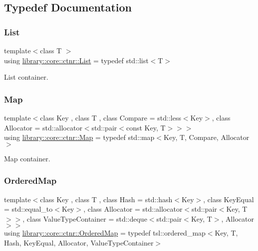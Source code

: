 \subsection{Typedef Documentation}
\mbox{\label{namespacelibrary_1_1core_1_1ctnr_a87ccf40619002299b341a5e76e989912}} 
\subsubsection{\texorpdfstring{List}{List}}
{\footnotesize\ttfamily template$<$class T $>$ \\
using \mbox{\hyperlink{namespacelibrary_1_1core_1_1ctnr_a87ccf40619002299b341a5e76e989912}{library\+::core\+::ctnr\+::\+List}} = typedef std\+::list$<$T$>$}



List container. 

\mbox{\label{namespacelibrary_1_1core_1_1ctnr_a248e088a0b4ec44aff451a5c3663dcee}} 
\subsubsection{\texorpdfstring{Map}{Map}}
{\footnotesize\ttfamily template$<$class Key , class T , class Compare  = std\+::less$<$\+Key$>$, class Allocator  = std\+::allocator$<$std\+::pair$<$const Key, T$>$$>$$>$ \\
using \mbox{\hyperlink{namespacelibrary_1_1core_1_1ctnr_a248e088a0b4ec44aff451a5c3663dcee}{library\+::core\+::ctnr\+::\+Map}} = typedef std\+::map$<$Key, T, Compare, Allocator$>$}



Map container. 

\mbox{\label{namespacelibrary_1_1core_1_1ctnr_a1c0809231c3bc9fccce602bd7941a36b}} 
\subsubsection{\texorpdfstring{OrderedMap}{OrderedMap}}
{\footnotesize\ttfamily template$<$class Key , class T , class Hash  = std\+::hash$<$\+Key$>$, class Key\+Equal  = std\+::equal\+\_\+to$<$\+Key$>$, class Allocator  = std\+::allocator$<$std\+::pair$<$\+Key, T$>$$>$, class Value\+Type\+Container  = std\+::deque$<$std\+::pair$<$\+Key, T$>$, Allocator$>$$>$ \\
using \mbox{\hyperlink{namespacelibrary_1_1core_1_1ctnr_a1c0809231c3bc9fccce602bd7941a36b}{library\+::core\+::ctnr\+::\+Ordered\+Map}} = typedef tsl\+::ordered\+\_\+map$<$Key, T, Hash, Key\+Equal, Allocator, Value\+Type\+Container$>$}



